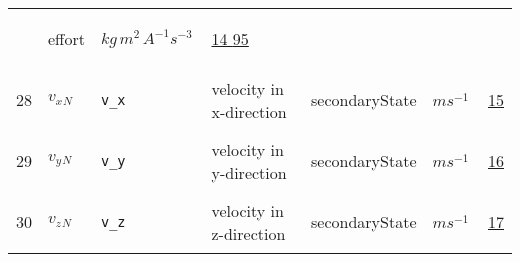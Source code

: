 \begin{longtable}{|p{1cm}|p{2.5cm}|p{4.5cm}|p{8cm}|p{3.0cm}|p{3cm}|p{1cm}|}
             & \begin{lay}effort \end{lay}
             & $ kg \,m^{2} \,A^{-1} s^{-3} \, $
             &                 \hyperlink{"e:14"}{ 14 }
                                 \hyperlink{"e:95"}{ 95 }
                 \\
            28
             & \hypertarget{"v:28"}{ $ {{v_x}}{_{N}} $}
             & \verb|v_x|
             & velocity in x-direction
             & \begin{lay}secondaryState \end{lay}
             & $ m s^{-1} \, $
             &                 \hyperlink{"e:15"}{ 15 }
                 \\
            29
             & \hypertarget{"v:29"}{ $ {{v_y}}{_{N}} $}
             & \verb|v_y|
             & velocity in y-direction
             & \begin{lay}secondaryState \end{lay}
             & $ m s^{-1} \, $
             &                 \hyperlink{"e:16"}{ 16 }
                 \\
            30
             & \hypertarget{"v:30"}{ $ {{v_z}}{_{N}} $}
             & \verb|v_z|
             & velocity in z-direction
             & \begin{lay}secondaryState \end{lay}
             & $ m s^{-1} \, $
             &                 \hyperlink{"e:17"}{ 17 }
                 \\
    \end{longtable}